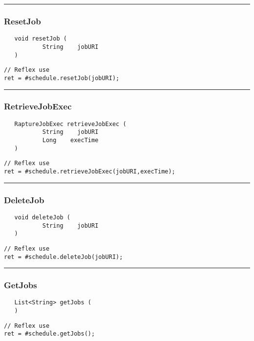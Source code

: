 \rule{15cm}{2pt}
\subsubsection{ResetJob}
\label{Api:ResetJob}
\begin{verbatim}
   void resetJob (
           String    jobURI
   )
\end{verbatim}
\begin{lstlisting}[language=reflex]
// Reflex use
ret = #schedule.resetJob(jobURI);
\end{lstlisting}



\rule{15cm}{2pt}
\subsubsection{RetrieveJobExec}
\label{Api:RetrieveJobExec}
\begin{verbatim}
   RaptureJobExec retrieveJobExec (
           String    jobURI
           Long    execTime
   )
\end{verbatim}
\begin{lstlisting}[language=reflex]
// Reflex use
ret = #schedule.retrieveJobExec(jobURI,execTime);
\end{lstlisting}



\rule{15cm}{2pt}
\subsubsection{DeleteJob}
\label{Api:DeleteJob}
\begin{verbatim}
   void deleteJob (
           String    jobURI
   )
\end{verbatim}
\begin{lstlisting}[language=reflex]
// Reflex use
ret = #schedule.deleteJob(jobURI);
\end{lstlisting}



\rule{15cm}{2pt}
\subsubsection{GetJobs}
\label{Api:GetJobs}
\begin{verbatim}
   List<String> getJobs (
   )
\end{verbatim}
\begin{lstlisting}[language=reflex]
// Reflex use
ret = #schedule.getJobs();
\end{lstlisting}



